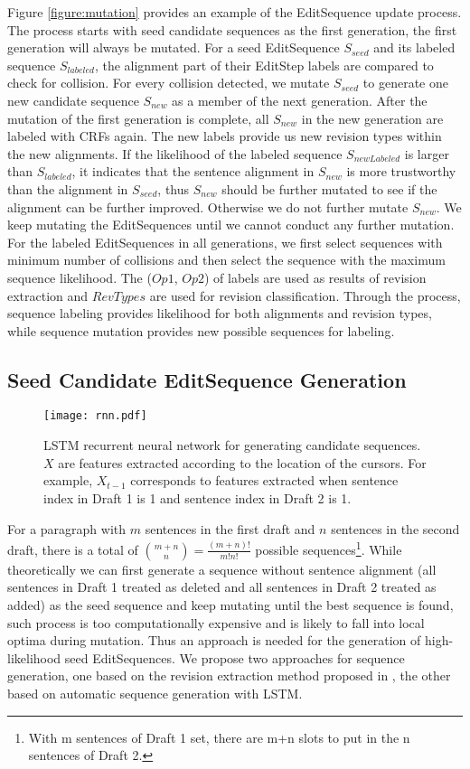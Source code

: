 \documentclass[11pt]{article}
\begin{document}
 Figure \ref{figure:mutation} provides an example of the EditSequence update process. The process starts with seed candidate sequences as the first generation, the first generation will always be mutated. For a seed EditSequence $S_{seed}$ and its labeled sequence $S_{labeled}$, the alignment part of their EditStep labels are compared to check for collision. For every collision detected, we mutate $S_{seed}$ to generate one new candidate sequence $S_{new}$ as a member of the next generation. After the mutation of the first generation is complete, all $S_{new}$ in the new generation are labeled with CRFs again. The new labels provide us new revision types within the new alignments.  If the likelihood of the labeled sequence $S_{newLabeled}$ is larger than $S_{labeled}$, it indicates that the sentence alignment in $S_{new}$ is more trustworthy than the alignment in $S_{seed}$, thus $S_{new}$ should be further mutated to see if the alignment can be further improved. Otherwise we do not further mutate $S_{new}$. We keep mutating the EditSequences until we cannot conduct any further mutation.  For the labeled EditSequences in all generations, we first select sequences with minimum number of collisions and then select the sequence with the maximum sequence likelihood. The ($Op1$, $Op2$) of labels are used as results of revision extraction and $RevTypes$ are used for revision classification. Through the process, sequence labeling provides likelihood for both alignments and revision types, while sequence mutation provides new possible sequences for labeling.

\subsection{Seed Candidate EditSequence Generation}
\begin{figure}
\centering
\texttt{[image: rnn.pdf]}
\caption{LSTM recurrent neural network for generating candidate sequences. $X$ are features extracted according to the location of the cursors. For example, $X_{t-1}$ corresponds to features extracted when sentence index in Draft 1 is 1 and sentence index in Draft 2 is 1.}
\label{figure:lstm}
\end{figure}

For a paragraph with $m$ sentences in the first draft and $n$ sentences in the second draft, there is a total of $\binom{m+n}{n} = \frac{(m+n)!}{m!n!}$ possible sequences\footnote{With m sentences of Draft 1 set, there are m+n slots to put in the n sentences of Draft 2.}. While theoretically we can first generate a sequence without sentence alignment (all sentences in Draft 1 treated as deleted and all sentences in Draft 2 treated as added) as the seed sequence and keep mutating until the best sequence is found, such process is too computationally expensive and is likely to fall into local optima during mutation. Thus an approach is needed for the generation of high-likelihood seed EditSequences. We propose two approaches for sequence generation, one based on the revision extraction method proposed in \cite{zhang-litman:2014:W14-18}, the other based on automatic sequence generation with LSTM.
\end{document}
